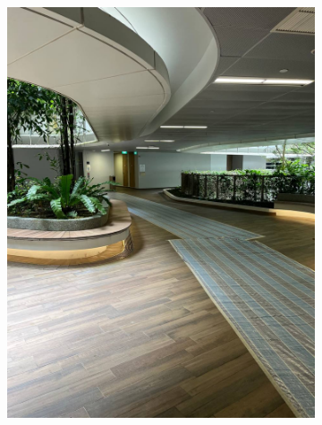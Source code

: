 \documentclass[12pt]{report}
\begin{document}
\begin{figure}[h]
    \centering
    \begin{subfigure}[b]{0.19\textwidth}
        \centering
        \includegraphics[width=\textwidth]{walking-area-1}
    \end{subfigure}
    \begin{subfigure}[b]{0.19\textwidth}
        \centering

\end{subfigure}
\end{figure}
\end{document}
